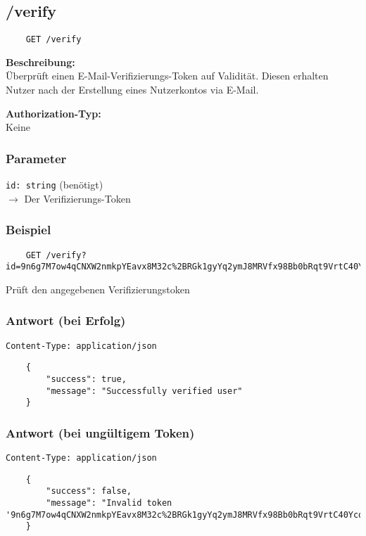 \subsection{/verify}

\begin{lstlisting}
    GET /verify
\end{lstlisting}

\textbf{Beschreibung:} \\
Überprüft einen E-Mail-Verifizierungs-Token auf Validität. Diesen erhalten Nutzer nach der Erstellung eines Nutzerkontos via E-Mail.

\textbf{Authorization-Typ:} \\
Keine

\subsubsection{Parameter}

\lstinline{id: string} (benötigt) \\
$\rightarrow$ Der Verifizierungs-Token

\subsubsection{Beispiel}

\begin{lstlisting}
    GET /verify?id=9n6g7M7ow4qCNXW2nmkpYEavx8M32c%2BRGk1gyYq2ymJ8MRVfx98Bb0bRqt9VrtC40YcqKWpRk86FAShSH4zhQ%3D%3D
\end{lstlisting}

Prüft den angegebenen Verifizierungstoken

\subsubsection{Antwort (bei Erfolg)}

\lstinline{Content-Type: application/json}
\begin{lstlisting}
    {
        "success": true, 
        "message": "Successfully verified user"
    }
\end{lstlisting}

\subsubsection{Antwort (bei ungültigem Token)}

\lstinline{Content-Type: application/json}
\begin{lstlisting}
    {
        "success": false, 
        "message": "Invalid token '9n6g7M7ow4qCNXW2nmkpYEavx8M32c%2BRGk1gyYq2ymJ8MRVfx98Bb0bRqt9VrtC40YcqKWpRk86FAShSH4zhQ%3D%3D'" 
    }
\end{lstlisting}
